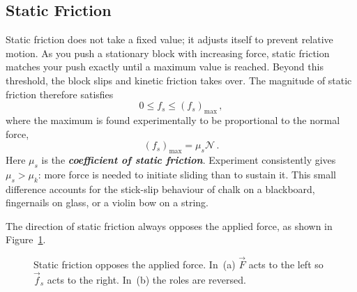 \subsection{Static Friction}

Static friction does not take a fixed value; it adjusts itself to prevent relative motion. As you push a stationary block with increasing force, static friction matches your push exactly until a maximum value is reached. Beyond this threshold, the block slips and kinetic friction takes over. The magnitude of static friction therefore satisfies
\begin{equation}
    0 \leq f_s \leq (f_s)_{\max}\,,
\end{equation}
where the maximum is found experimentally to be proportional to the normal force,
\begin{equation}
    (f_s)_{\max} = \mu_s \mathscr{N}\,.
\end{equation}
Here $\mu_s$ is the \textbf{\textit{coefficient of static friction}}. Experiment consistently gives $\mu_s > \mu_k$: more force is needed to initiate sliding than to sustain it. This small difference accounts for the stick-slip behaviour of chalk on a blackboard, fingernails on glass, or a violin bow on a string.

The direction of static friction always opposes the applied force, as shown in Figure~\ref{fig:staticdir}.

\begin{figure}[ht]
\centering
{}
\caption{Static friction opposes the applied force. In~(a) $\vec{F}$ acts to the left so $\vec{f}_s$ acts to the right. In~(b) the roles are reversed.}
\label{fig:staticdir}
\end{figure}

